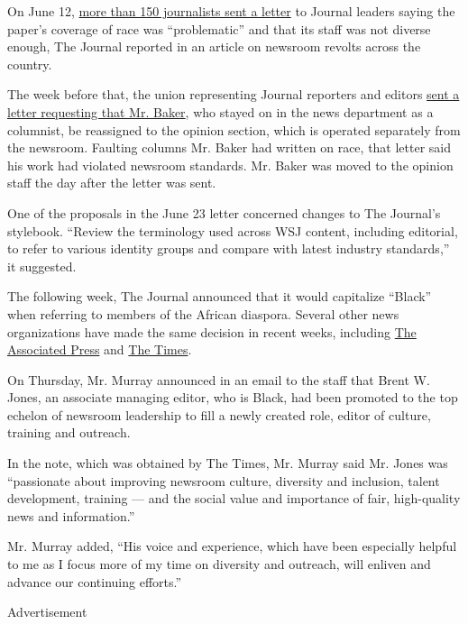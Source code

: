 On June 12,
\href{https://www.wsj.com/articles/americas-newsrooms-face-a-reckoning-on-race-after-floyd-protests-11592256570}{more
than 150 journalists sent a letter} to Journal leaders saying the
paper's coverage of race was ``problematic'' and that its staff was not
diverse enough, The Journal reported in an article on newsroom revolts
across the country.

The week before that, the union representing Journal reporters and
editors
\href{https://www.nytimes3xbfgragh.onion/2020/06/09/business/wall-street-journal-gerard-baker-editor.html}{sent
a letter requesting that Mr. Baker}, who stayed on in the news
department as a columnist, be reassigned to the opinion section, which
is operated separately from the newsroom. Faulting columns Mr. Baker had
written on race, that letter said his work had violated newsroom
standards. Mr. Baker was moved to the opinion staff the day after the
letter was sent.

One of the proposals in the June 23 letter concerned changes to The
Journal's stylebook. ``Review the terminology used across WSJ content,
including editorial, to refer to various identity groups and compare
with latest industry standards,'' it suggested.

The following week, The Journal announced that it would capitalize
``Black'' when referring to members of the African diaspora. Several
other news organizations have made the same decision in recent weeks,
including \href{https://apnews.com/71386b46dbff8190e71493a763e8f45a}{The
Associated Press} and
\href{https://www.nytimes3xbfgragh.onion/2020/07/05/insider/capitalized-black.html}{The
Times}.

On Thursday, Mr. Murray announced in an email to the staff that Brent W.
Jones, an associate managing editor, who is Black, had been promoted to
the top echelon of newsroom leadership to fill a newly created role,
editor of culture, training and outreach.

In the note, which was obtained by The Times, Mr. Murray said Mr. Jones
was ``passionate about improving newsroom culture, diversity and
inclusion, talent development, training --- and the social value and
importance of fair, high-quality news and information.''

Mr. Murray added, ``His voice and experience, which have been especially
helpful to me as I focus more of my time on diversity and outreach, will
enliven and advance our continuing efforts.''

Advertisement

